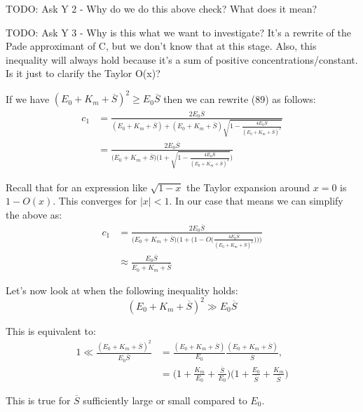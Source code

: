 \documentclass[12pt]{article}
\begin{document}
TODO: Ask Y 2 - Why do we do this above check? What does it mean?

TODO: Ask Y 3 - Why is this what we want to investigate? It's a
rewrite of the Pade approximant of C, but we don't know that at this
stage. Also, this inequality will always hold because it's a sum of
positive concentrations/constant. Is it just to clarify the Taylor
O(x)?

If we have $(E_0 + K_m + \overline{S})^2 \geq E_0 \overline{S}$ then
we can rewrite (89) as follows:
\begin{align}
  c_1 &= \frac{2 E_0 \overline{S}}
              {(E_0 + K_m + \overline{S}) + (E_0 + K_m + \overline{S})
              \sqrt{1- \frac{4 E_0 \overline{S}}
                            {(E_0 + K_m + \overline{S})^2}}} \\
      &= \frac{2 E_0 \overline{S}}
              {\Big(E_0 + K_m + \overline{S}\Big)
              \Big(1 + \sqrt{1- \frac{4 E_0 \overline{S}}
                  {(E_0 + K_m + \overline{S})^2}}\Big)}
\end{align}

Recall that for an expression like $\sqrt{1-x}$ the Taylor expansion
around $x=0$ is $1 - O(x)$. This converges for $|x| < 1$. In our case
that means we can simplify the above as:
\begin{align}
   c_1 &= \frac{2 E_0 \overline{S}}
              {\Big(E_0 + K_m + \overline{S}\Big)
               \Big(1 + \Big(1 -
                O\Big(\frac{4 E_0 \overline{S}}
                           {(E_0 + K_m + \overline{S})^2}\Big)\Big)\Big)} \\
      &\approx \frac{E_0 \overline{S}}
                    {E_0 + K_m + \overline{S}}
\end{align}

Let's now look at when the following inequality holds:
\begin{equation}
(E_0 + K_m + \overline{S})^2 \gg E_0 \overline{S}
\end{equation}

This is equivalent to:
\begin{align}
1 \ll
  \frac{(E_0 + K_m + \overline{S})^2}
           {E_0 \overline{S}} &= 
\frac{(E_0 + K_m + \overline{S})}
      {E_0} \frac{(E_0 + K_m + \overline{S})}{\overline{S}}, \\
&= \Big(1 + \frac{K_m}{E_0} + \frac{\overline{S}}{E_0}\Big)
   \Big(1 + \frac{E_0}{\overline{S}} + \frac{K_m}{\overline{S}}\Big)
\end{align}

This is true for $\overline{S}$ sufficiently large or small compared
to $E_0$.
\end{document}
